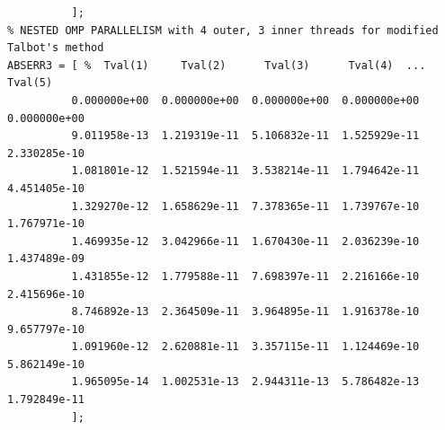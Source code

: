 \documentclass[a4paper,10pt]{report}%
\begin{document}
\begin{lstlisting}
          ];
% NESTED OMP PARALLELISM with 4 outer, 3 inner threads for modified Talbot's method
ABSERR3 = [ %  Tval(1)     Tval(2)      Tval(3)      Tval(4)  ... Tval(5)
          0.000000e+00  0.000000e+00  0.000000e+00  0.000000e+00  0.000000e+00
          9.011958e-13  1.219319e-11  5.106832e-11  1.525929e-11  2.330285e-10
          1.081801e-12  1.521594e-11  3.538214e-11  1.794642e-11  4.451405e-10
          1.329270e-12  1.658629e-11  7.378365e-11  1.739767e-10  1.767971e-10
          1.469935e-12  3.042966e-11  1.670430e-11  2.036239e-10  1.437489e-09
          1.431855e-12  1.779588e-11  7.698397e-11  2.216166e-10  2.415696e-10
          8.746892e-13  2.364509e-11  3.964895e-11  1.916378e-10  9.657797e-10
          1.091960e-12  2.620881e-11  3.357115e-11  1.124469e-10  5.862149e-10
          1.965095e-14  1.002531e-13  2.944311e-13  5.786482e-13  1.792849e-11
          ];
\end{lstlisting}
\end{document}
